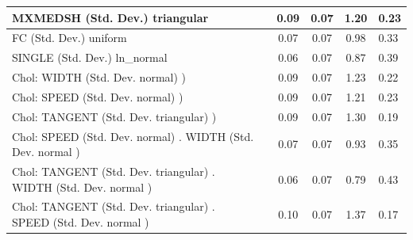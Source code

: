 \begin{table}
\begin{center}
\begin{tabular}{|l|l|c|c|c|l|}
			\hline
			MXMEDSH (Std. Dev.) triangular &  & 0.09 & 0.07 & 1.20 & 0.23 \\
			\hline
			FC (Std. Dev.) uniform &  & 0.07 & 0.07 & 0.98 & 0.33 \\
			\hline
			SINGLE (Std. Dev.) ln_normal &  & 0.06 & 0.07 & 0.87 & 0.39 \\
			\hline
			 Chol: WIDTH (Std. Dev. normal) ) &  & 0.09 & 0.07 & 1.23 & 0.22 \\
			\hline
			 Chol: SPEED (Std. Dev. normal) ) &  & 0.09 & 0.07 & 1.21 & 0.23 \\
			\hline
			 Chol: TANGENT (Std. Dev. triangular) ) &  & 0.09 & 0.07 & 1.30 & 0.19 \\
			\hline
			 Chol: SPEED (Std. Dev. normal) . WIDTH (Std. Dev.   normal ) &  & 0.07 & 0.07 & 0.93 & 0.35 \\
			\hline
			 Chol: TANGENT (Std. Dev. triangular) . WIDTH (Std. Dev.   normal ) &  & 0.06 & 0.07 & 0.79 & 0.43 \\
			\hline
			 Chol: TANGENT (Std. Dev. triangular) . SPEED (Std. Dev.   normal ) &  & 0.10 & 0.07 & 1.37 & 0.17 \\
			\hline
		\end{tabular}
	\end{center}
\end{table}